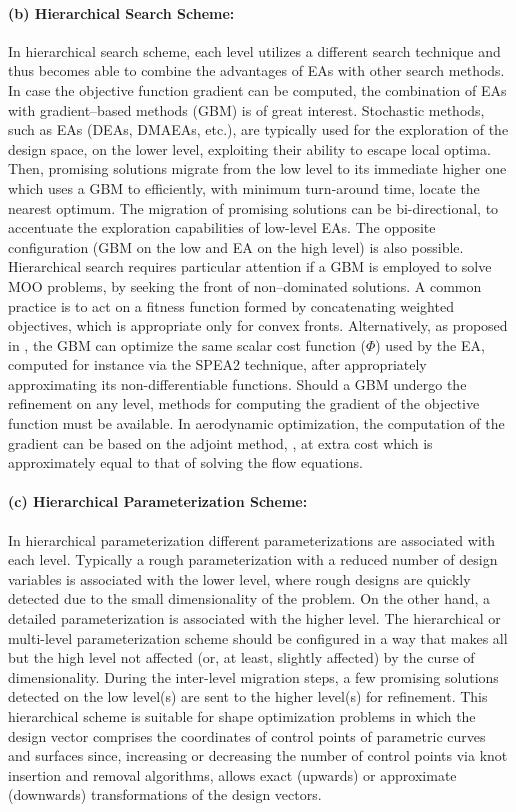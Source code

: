 \paragraph{(b) Hierarchical Search Scheme:}
In hierarchical search scheme, each level utilizes a different search technique and thus becomes able to combine the advantages of EAs with other search methods. In case the objective function gradient can be computed, the combination of EAs with gradient–based methods (GBM) is of great interest. Stochastic methods, such as EAs (DEAs, DMAEAs, etc.), are typically used for the exploration of the design space, on the lower level, exploiting their ability to escape local optima. Then, promising solutions migrate from the low level to its immediate higher one which uses a GBM to efficiently, with minimum turn-around time, locate the nearest optimum. The migration of promising solutions can be bi-directional, to accentuate the exploration capabilities of low-level EAs. The opposite configuration (GBM on the low and EA on the high level) is also possible. Hierarchical search requires particular attention if a GBM is employed to solve MOO problems, by seeking the front of non–dominated solutions. A common practice is to act on a fitness function formed by concatenating weighted objectives, which is appropriate only for convex fronts. Alternatively, as proposed in \cite{LTT_2_036}, the GBM can optimize the same scalar cost function ($\Phi$) used by the EA, computed for instance via the SPEA2 technique, after appropriately approximating its non-differentiable functions. Should a GBM undergo the refinement on any level, methods for computing the gradient of the objective function must be available. In aerodynamic optimization, the computation of the gradient can be based on the adjoint method, \cite{LTT_2_032}, at extra cost which is approximately equal to that of solving the flow equations.


\paragraph{(c) Hierarchical Parameterization Scheme:}
In hierarchical parameterization different parameterizations are  associated with each level. Typically a rough parameterization with a reduced number of design variables is associated with the lower level, where rough designs are quickly detected due to the small dimensionality of the problem. On the other hand, a detailed parameterization is associated with the higher level.  The hierarchical or multi-level parameterization scheme should be configured in a way that makes all but the high level not affected (or, at least, slightly affected) by the curse of dimensionality. During the inter-level migration steps, a few promising solutions detected on the low level(s) are sent to the higher level(s) for refinement. This hierarchical scheme is suitable for shape optimization problems in which the design vector comprises the coordinates of control points of parametric curves and surfaces since, increasing or decreasing the number of control points via knot insertion and removal algorithms, allows exact (upwards) or approximate (downwards) transformations of the design vectors.


